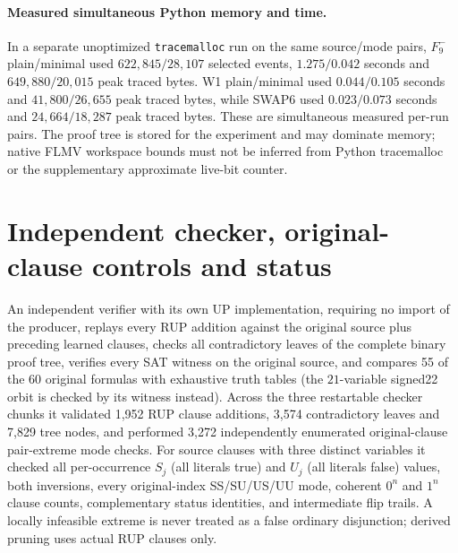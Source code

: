 \documentclass[10pt]{article}
\begin{document}
\paragraph{Measured simultaneous Python memory and time.} In a separate
unoptimized \texttt{tracemalloc} run on the same source/mode pairs,
$F_9^-$ plain/minimal used $622{,}845/28{,}107$ selected events,
$1.275/0.042$ seconds and $649{,}880/20{,}015$ peak traced bytes.
W1 plain/minimal used $0.044/0.105$ seconds and
$41{,}800/26{,}655$ peak traced bytes, while SWAP6 used
$0.023/0.073$ seconds and $24{,}664/18{,}287$ peak traced bytes.
These are simultaneous measured per-run pairs. The proof tree is stored for
the experiment and may dominate memory; native FLMV workspace bounds must not
be inferred from Python tracemalloc or the supplementary approximate live-bit
counter.

\section{Independent checker, original-clause controls and status}
An independent verifier with its own UP implementation, requiring no import
of the producer, replays every RUP addition against the original source plus
preceding learned clauses, checks all contradictory leaves of the complete
binary proof tree, verifies every SAT witness on the original source, and
compares 55 of the 60 original formulas with exhaustive truth tables (the
$21$-variable signed22 orbit is checked by its witness instead).
Across the three restartable checker chunks it validated 1,952 RUP clause
additions, 3,574 contradictory leaves and 7,829 tree nodes, and performed
3,272 independently enumerated original-clause pair-extreme mode checks.
For source clauses with three distinct variables it checked all per-occurrence
$S_j$ (all literals true) and $U_j$ (all literals false) values, both
inversions, every original-index SS/SU/US/UU mode, coherent $0^n$ and
$1^n$ clause counts, complementary status identities, and intermediate
flip trails. A locally infeasible extreme is never treated as a false
ordinary disjunction; derived pruning uses actual RUP clauses only.
\end{document}
